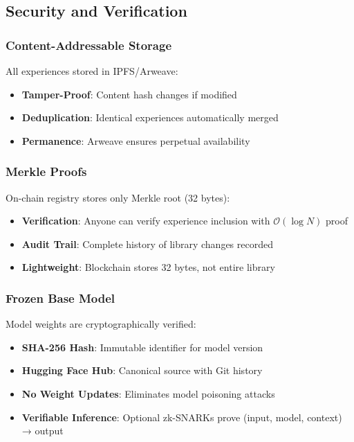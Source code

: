 \documentclass[11pt,a4paper]{article}
\begin{document}
\subsection{Security and Verification}

\subsubsection{Content-Addressable Storage}
All experiences stored in IPFS/Arweave:
\begin{itemize}
    \item \textbf{Tamper-Proof}: Content hash changes if modified
    \item \textbf{Deduplication}: Identical experiences automatically merged
    \item \textbf{Permanence}: Arweave ensures perpetual availability
\end{itemize}

\subsubsection{Merkle Proofs}
On-chain registry stores only Merkle root (32 bytes):
\begin{itemize}
    \item \textbf{Verification}: Anyone can verify experience inclusion with $\mathcal{O}(\log N)$ proof
    \item \textbf{Audit Trail}: Complete history of library changes recorded
    \item \textbf{Lightweight}: Blockchain stores 32 bytes, not entire library
\end{itemize}

\subsubsection{Frozen Base Model}
Model weights are cryptographically verified:
\begin{itemize}
    \item \textbf{SHA-256 Hash}: Immutable identifier for model version
    \item \textbf{Hugging Face Hub}: Canonical source with Git history
    \item \textbf{No Weight Updates}: Eliminates model poisoning attacks
    \item \textbf{Verifiable Inference}: Optional zk-SNARKs prove (input, model, context) → output
\end{itemize}
\end{document}
